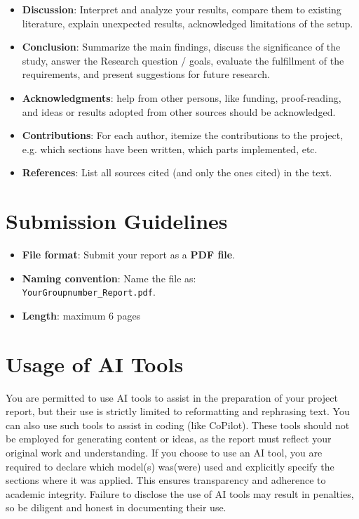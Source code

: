 \documentclass[conference]{IEEEtran}
\begin{document}
\begin{itemize}
    \item \textbf{Discussion}: Interpret and analyze your results, compare them to existing literature, explain unexpected results, acknowledged limitations of the setup.
    \item \textbf{Conclusion}: Summarize the main findings, discuss the significance of the study, answer the Research question / goals, evaluate the fulfillment of the requirements, and present suggestions for future research.
    \item \textbf{Acknowledgments}: help from other persons, like funding, proof-reading, and ideas or results adopted from other sources should be acknowledged.
    \item \textbf{Contributions}: For each author, itemize the contributions to the project, e.g. which sections have been written, which parts implemented, etc.     
    \item \textbf{References}: List all sources cited (and only the ones cited) in the text.
\end{itemize}

\section{Submission Guidelines}
\begin{itemize}
    \item \textbf{File format}: Submit your report as a \textbf{PDF file}.
    \item \textbf{Naming convention}: Name the file as: \\\texttt{YourGroupnumber\_Report.pdf}.
    \item \textbf{Length}: maximum 6 pages
    
\end{itemize}

\section{Usage of AI Tools}

\noindent You are permitted to use AI tools to assist in the preparation of your project report, but their use is strictly limited to reformatting and rephrasing text. You can also use such tools to assist in coding (like CoPilot). These tools should not be employed for generating content or ideas, as the report must reflect your original work and understanding. If you choose to use an AI tool, you are required to declare which model(s) was(were) used and explicitly specify the sections where it was applied. This ensures transparency and adherence to academic integrity. Failure to disclose the use of AI tools may result in penalties, so be diligent and honest in documenting their use.
\end{document}
